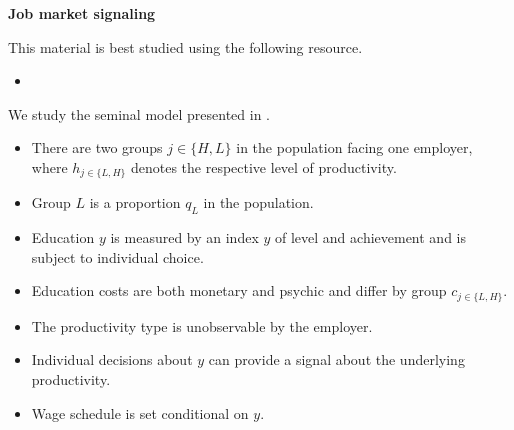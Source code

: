 \begin{frame}\begin{center}
		\LARGE\textbf{Job market signaling}
\end{center}\end{frame}
\begin{frame} This material is best studied using the following resource.\\\vspace{0.3cm}

\begin{itemize}
\item {}
\end{itemize}

\end{frame}
\begin{frame}

We study the seminal model presented in .
\begin{itemize}\setlength\itemsep{1em}
\item There are two groups $j \in\{H, L\}$ in the population facing one employer, where  $h_{j\in\{L, H\}}$ denotes the respective level of productivity.
\item Group $L$ is a proportion $q_L$ in the population.
\item Education $y$ is measured by an index $y$ of level and achievement and is subject to individual choice.
\item Education costs are both monetary and psychic and differ by group $c_{j\in\{L, H\}}$.
\end{itemize}

\end{frame}

\begin{frame}

\begin{itemize}\setlength\itemsep{1em}
\item The productivity type is unobservable by the employer.
\item Individual decisions about $y$ can provide a signal about the underlying productivity.
\item Wage schedule is set conditional on $y$.
\end{itemize}
\end{frame}

